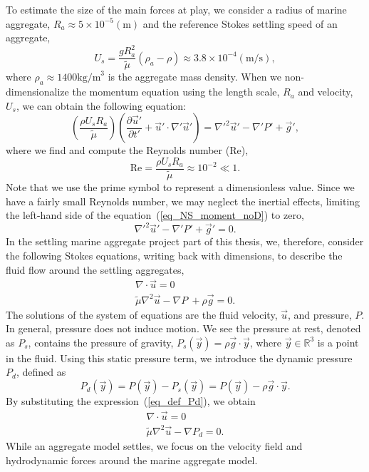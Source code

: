 To estimate the size of the main forces at play, we consider a radius of marine aggregate, $R_a \approx 5 \times 10^{-5} (\text{m})$ and the reference Stokes settling speed of an aggregate,
\begin{equation}
    U_s =  \frac{gR_a^2}{{\tilde{\mu}}} (\rho_a-\rho) \approx 3.8 \times 10^{-4} ({\text{m/s}}),
	\label{eq_U_s}
\end{equation}
where $\rho_a \approx 1400\text{kg/m}^3$ is the aggregate mass density. 
When we non-dimensionalize the momentum equation using the length scale, $R_a$ and velocity, $U_s$, we can obtain the following equation:
\begin{equation}
	\left(\frac{\rho U_s R_a}{{\tilde{\mu}}} \right) 
   \left( 
   \frac{\partial \vec{u}'}{\partial t'} + \vec{u}'\cdot \nabla' \vec{u}'
\right)
 = {\nabla'}^2 \vec{u}' - \nabla' P' +  \vec{g}',
 \label{eq_NS_moment_noD}
\end{equation}
where we find and compute the Reynolds number (Re),
\begin{equation}
	\text{Re} = \frac{\rho U_s R_a}{{\tilde{\mu}}} \approx 10^{-2}
	\ll 1.
   \label{eq_Re}
\end{equation}
Note that we use the prime symbol to represent a dimensionless value.
Since we have a fairly small Reynolds number, we may neglect the inertial effects, limiting the left-hand side of the equation~(\ref{eq_NS_moment_noD}) to zero,
\begin{equation}
   {\nabla'}^2 \vec{u}' - \nabla' P' +  \vec{g}' = 0.
\end{equation}
In the settling marine aggregate project part of this thesis, we, therefore, consider the following Stokes equations, writing back with dimensions, to describe the fluid flow around the settling aggregates,
 \begin{align}
	\nabla \cdot \vec{u}  = 0  
	\nonumber \\
	{\tilde{\mu}} \nabla^2 \vec{u}    - \nabla P\ + \rho  \vec{g} = 0.
	\label{eq_stokes2}
\end{align}
The solutions of the system of equations are the fluid velocity, $\vec{u}$, and pressure, $P$. In general, pressure does not induce motion. We see the pressure at rest, denoted as $P_s$, contains the pressure of gravity,  $P_s(\vec{y}) = \rho \vec{g} \cdot \vec{y}$, where $\vec{y} \in \mathbb{R}^3$ is a point in the fluid. Using this static pressure term, we introduce the dynamic pressure $P_d$, defined as 
\begin{equation}
   P_d(\vec{y}) = P(\vec{y}) - P_s(\vec{y}) = P(\vec{y}) - \rho \vec{g} \cdot \vec{y}.
   \label{eq_def_Pd}
\end{equation}
By substituting the expression~(\ref{eq_def_Pd}), we obtain
\begin{align}
	\nabla \cdot \vec{u}  = 0  
	\nonumber \\
	{\tilde{\mu}} \nabla^2 \vec{u}    - \nabla P_d = 0.
	\label{eq_stokes3}
\end{align}
While an aggregate model settles, we focus on the velocity field and hydrodynamic forces around the marine aggregate model. 
